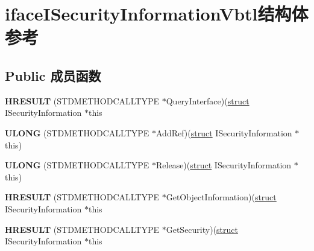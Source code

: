 \hypertarget{structiface_i_security_information_vbtl}{}\section{iface\+I\+Security\+Information\+Vbtl结构体 参考}
\label{structiface_i_security_information_vbtl}
\subsection*{Public 成员函数}
\begin{DoxyCompactItemize}
\item 
\mbox{\label{structiface_i_security_information_vbtl_afbfdad1c78cc157f2b8d695c96e06a7d}} 
{\bfseries H\+R\+E\+S\+U\+LT} (S\+T\+D\+M\+E\+T\+H\+O\+D\+C\+A\+L\+L\+T\+Y\+PE $\ast$Query\+Interface)(\hyperlink{interfacestruct}{struct} I\+Security\+Information $\ast$this
\item 
\mbox{\label{structiface_i_security_information_vbtl_a17d6bf15b03ddf2412d90c5fad87b3c7}} 
{\bfseries U\+L\+O\+NG} (S\+T\+D\+M\+E\+T\+H\+O\+D\+C\+A\+L\+L\+T\+Y\+PE $\ast$Add\+Ref)(\hyperlink{interfacestruct}{struct} I\+Security\+Information $\ast$this)
\item 
\mbox{\label{structiface_i_security_information_vbtl_abe0abdd166cdf09aea176e396ce13700}} 
{\bfseries U\+L\+O\+NG} (S\+T\+D\+M\+E\+T\+H\+O\+D\+C\+A\+L\+L\+T\+Y\+PE $\ast$Release)(\hyperlink{interfacestruct}{struct} I\+Security\+Information $\ast$this)
\item 
\mbox{\label{structiface_i_security_information_vbtl_ad8fdcd728029e5af51d2c3dc6f6aad2a}} 
{\bfseries H\+R\+E\+S\+U\+LT} (S\+T\+D\+M\+E\+T\+H\+O\+D\+C\+A\+L\+L\+T\+Y\+PE $\ast$Get\+Object\+Information)(\hyperlink{interfacestruct}{struct} I\+Security\+Information $\ast$this
\item 
\mbox{\label{structiface_i_security_information_vbtl_a814ef41df97fe27309aa7e076658cf43}} 
{\bfseries H\+R\+E\+S\+U\+LT} (S\+T\+D\+M\+E\+T\+H\+O\+D\+C\+A\+L\+L\+T\+Y\+PE $\ast$Get\+Security)(\hyperlink{interfacestruct}{struct} I\+Security\+Information $\ast$this

\end{DoxyCompactItemize}
